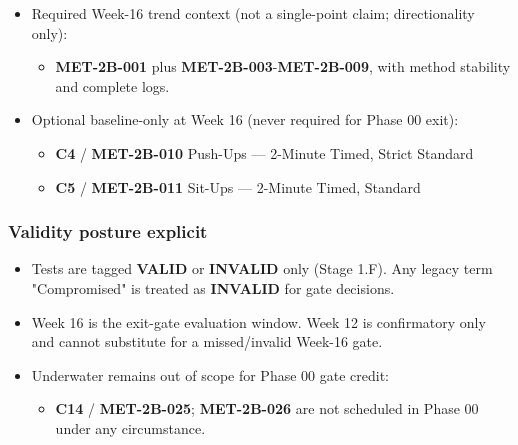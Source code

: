 \documentclass[10pt]{article}
\begin{document}
\begin{itemize}
\item Required Week-16 trend context (not a single-point claim; directionality only):
  \begin{itemize}
  \item \textbf{MET-2B-001} plus \textbf{MET-2B-003}-\textbf{MET-2B-009}, with method stability and complete logs.
  \end{itemize}

\item Optional baseline-only at Week 16 (never required for Phase 00 exit):
  \begin{itemize}
  \item \textbf{C4} / \textbf{MET-2B-010} Push-Ups — 2-Minute Timed, Strict Standard
  \item \textbf{C5} / \textbf{MET-2B-011} Sit-Ups — 2-Minute Timed, Standard
  \end{itemize}
\end{itemize}

\subsubsection*{Validity posture explicit}

\begin{itemize}
\item Tests are tagged \textbf{VALID} or \textbf{INVALID} only (Stage 1.F). Any legacy term "Compromised" is treated as \textbf{INVALID} for gate decisions.
\item Week 16 is the exit-gate evaluation window. Week 12 is confirmatory only and cannot substitute for a missed/invalid Week-16 gate.
\item Underwater remains out of scope for Phase 00 gate credit:
  \begin{itemize}
  \item \textbf{C14} / \textbf{MET-2B-025}; \textbf{MET-2B-026} are not scheduled in Phase 00 under any circumstance.
  \end{itemize}
\end{itemize}
\end{document}
